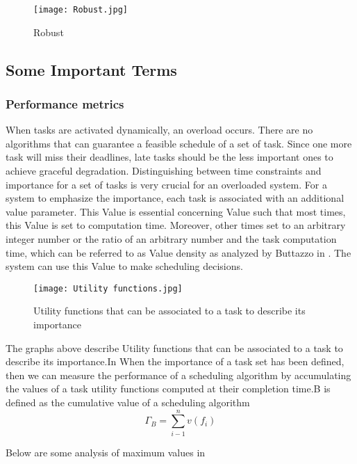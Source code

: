 \documentclass[conference]{IEEEtran}
\begin{document}
\begin{figure}[htp]
    \centering
    \texttt{[image: Robust.jpg]}
    \caption{Robust{\cite{buttazzo2011hard}}}
    \label{fig:reg-gen}
\end{figure}


\subsection{Some Important Terms}
\subsubsection{Performance metrics}
When tasks are activated dynamically, an overload occurs. There are no algorithms that can guarantee a feasible schedule of a set of task. Since one more task will miss their deadlines, late tasks should be the less important ones to achieve graceful degradation. Distinguishing between time constraints and importance for a set of tasks is very crucial for an overloaded system. For a system to emphasize the importance, each task is associated with an additional value parameter. This Value is essential concerning Value such that most times, this Value is set to computation time. Moreover, other times set to an arbitrary integer number or the ratio of an arbitrary number and the task computation time, which can be referred to as Value density as analyzed by Buttazzo in \cite{buttazzo2011hard}. The system can use this Value to make scheduling decisions. 
\begin{figure}[htp]
    \centering
    \texttt{[image: Utility functions.jpg]}
    \caption{Utility functions that can be associated to a task to describe its importance{ \cite{buttazzo2011hard}}}
    \label{fig:reg-gen}
\end{figure}

The graphs above describe Utility functions that can be associated to a task to describe its importance.In \cite{buttazzo2011hard} When the importance of a task set has been defined, then we can measure the performance of a scheduling algorithm by accumulating the values of a task utility functions computed at their completion time.B is defined as the cumulative value of a scheduling algorithm
\begin{equation} \label{equ:elastic}
    \Gamma_B = \sum_{i-1}^{n} v(f_i)
\end{equation}

Below are some analysis of maximum values in  \cite{buttazzo2011hard}
\end{document}
